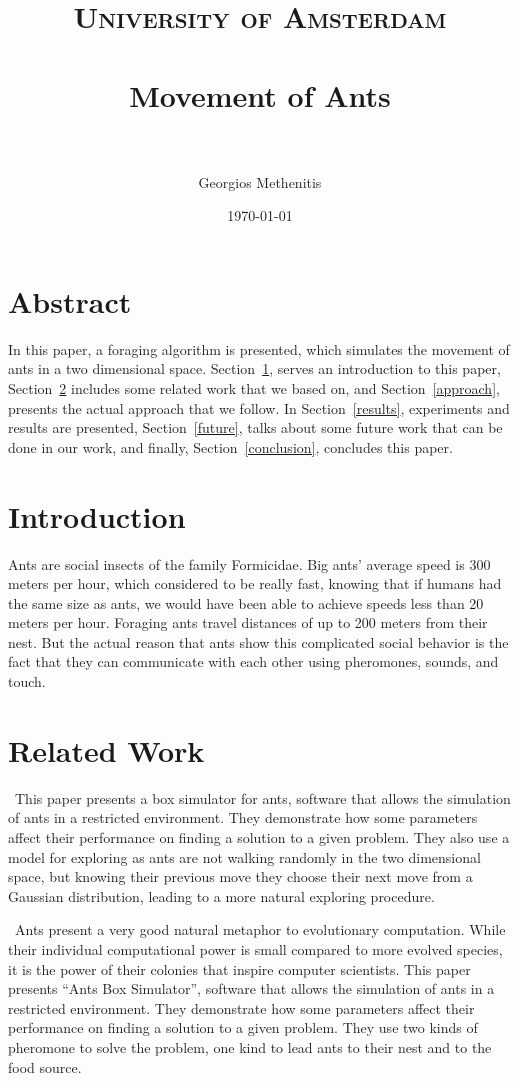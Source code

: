 \documentclass[paper=a4, fontsize=11pt]{scrartcl} %
\title{	
\normalfont \normalsize 
\textsc{University of Amsterdam} \\ [25pt] %
\horrule{0.5pt} \\[0.4cm] %
\huge Movement of Ants \\ %
\horrule{2pt} \\[0.5cm] %
}
\author{Georgios Methenitis} %
\date{\normalsize\today} %
\numberwithin{equation}{section} %
\numberwithin{figure}{section} %
\numberwithin{table}{section} %
\begin{document}
\maketitle %

\section*{Abstract}
In this paper, a foraging algorithm is presented, which simulates the movement of ants in a two dimensional space. Section~\ref{intro}, serves an introduction to this paper, Section~\ref{related} includes some related work that we based on, and Section~\ref{approach}, presents the actual approach that we follow. In Section~\ref{results}, experiments and results are presented, Section~\ref{future}, talks about some future work that can be done in our work, and finally, Section~\ref{conclusion}, concludes this paper.

\section{Introduction}
\label{intro}
Ants are social insects of the family Formicidae. Big ants' average speed is 300 meters per hour, which considered to be really fast, knowing that if humans had the same size as ants, we would have been able to achieve speeds less than 20 meters per hour. Foraging ants travel distances of up to 200 meters from their nest. But the actual reason that ants show this complicated social behavior is the fact that they can communicate with each other using pheromones, sounds, and touch.

\section{Related Work}
\label{related}
\cite{1}~This paper presents a box simulator for ants, software that allows the simulation of ants in a restricted environment. They demonstrate how some parameters affect their performance on finding a solution to a given problem. They also use a model for exploring as ants are not walking randomly in the two dimensional space, but knowing their previous move they choose their next move from a Gaussian distribution, leading to a more natural exploring procedure.

\cite{2}~Ants present a very good natural metaphor to evolutionary 
computation. While their individual computational power is small 
compared to more evolved species, it is the power of their colonies 
that inspire computer scientists. This paper presents ``Ants Box 
Simulator'', software that allows the simulation of ants in a restricted 
environment. They demonstrate how some parameters affect their 
performance on finding a solution to a given problem. They use two kinds of pheromone to solve the problem, one kind to lead ants to their nest and to the food source.
\end{document}

